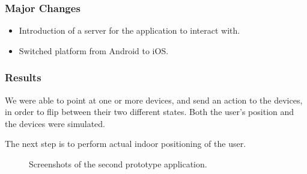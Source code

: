 \subsubsection{Major Changes}
\begin{itemize}
    \item Introduction of a server for the application to interact with.
    \item Switched platform from Android to iOS.
\end{itemize}

\subsubsection{Results}

We were able to point at one or more devices,
and send an action to the devices, 
in order to flip between their two different states. 
Both the user's position and the devices were simulated.

The next step is to perform actual indoor positioning of the user.

\begin{figure}[!htb]%
    \centering
    \caption{Screenshots of the second prototype application.}
    \label{fig:prototype2-app-screenshots}
\end{figure}

